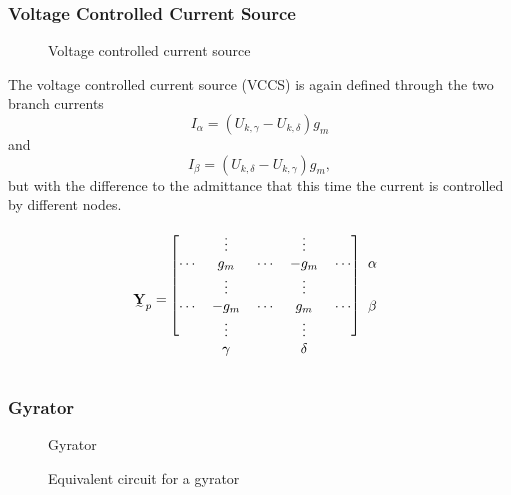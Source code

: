 \subsubsection{Voltage Controlled Current Source}

\begin{figure}
	\centering
	
	\caption{Voltage controlled current source}
	\label{fig:voltage_controlled_current_source}
\end{figure}

The voltage controlled current source (VCCS) is again defined through the two branch currents
\begin{equation}
	I_\alpha = (U_{k,\gamma} - U_{k,\delta}) g_m
\end{equation}
and
\begin{equation}
	I_\beta = (U_{k,\delta} - U_{k,\gamma}) g_m,
\end{equation}
but with the difference to the admittance that this time the current is controlled by different nodes.

\begin{equation}
	\mat Y_p = 	
	\begin{blockarray}{cccccc}
		\begin{block}{[ccccc]c}
		 		& \vdots	&			& \vdots	&			& \\
		\cdots	& g_m		& \cdots	& -g_m		& \cdots	& \alpha \\
		 		& \vdots	&			& \vdots	&			& \\
		\cdots	& -g_m		& \cdots	& g_m		& \cdots	& \beta \\
		 		& \vdots	&			& \vdots	&			& \\
		\end{block}
				& \gamma	&			& \delta	&			& 
	\end{blockarray}
\end{equation}

\subsubsection{Gyrator}

\begin{figure}
	\centering
	
	\caption{Gyrator}
	\label{fig:gyrator_original}
\end{figure}

\begin{figure}
	\centering
	
	\caption{Equivalent circuit for a gyrator}
	\label{fig:gyrator_equivalent}
\end{figure}

